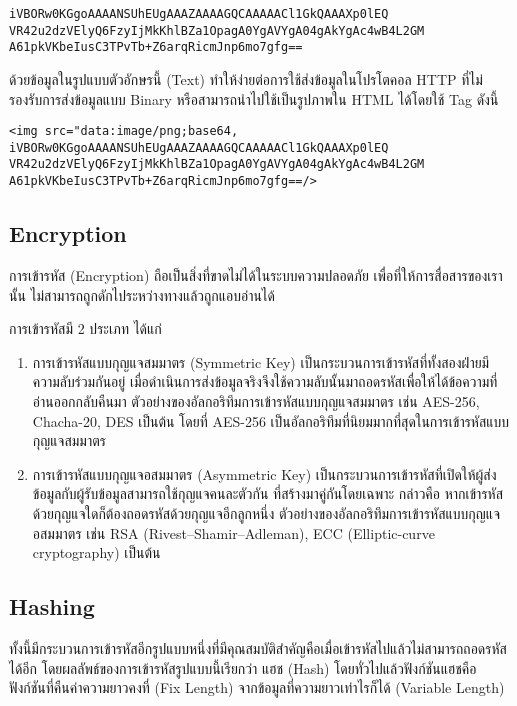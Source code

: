 \begin{lstlisting}[numbers=none]
iVBORw0KGgoAAAANSUhEUgAAAZAAAAGQCAAAAACl1GkQAAAXp0lEQ
VR42u2dzVElyQ6FzyIjMkKhlBZa1OpagA0YgAVYgA04gAkYgAc4wB4L2GM
A61pkVKbeIusC3TPvTb+Z6arqRicmJnp6mo7gfg==
\end{lstlisting}

ด้วยข้อมูลในรูปแบบตัวอักษรนี้ (Text) ทำให้ง่ายต่อการใช้ส่งข้อมูลในโปรโตคอล HTTP ที่ไม่รองรับการส่งข้อมูลแบบ Binary หรือสามารถนำไปใช้เป็นรูปภาพใน HTML ได้โดยใช้ Tag ดังนี้

\begin{lstlisting}[numbers=none]
<img src="data:image/png;base64, iVBORw0KGgoAAAANSUhEUgAAAZAAAAGQCAAAAACl1GkQAAAXp0lEQ VR42u2dzVElyQ6FzyIjMkKhlBZa1OpagA0YgAVYgA04gAkYgAc4wB4L2GM A61pkVKbeIusC3TPvTb+Z6arqRicmJnp6mo7gfg==/>
\end{lstlisting}

\subsection{Encryption}

การเข้ารหัส (Encryption) ถือเป็นสิ่งที่ขาดไม่ได้ในระบบความปลอดภัย เพื่อที่ให้การสื่อสารของเรานั้น ไม่สามารถถูกดักไประหว่างทางแล้วถูกแอบอ่านได้

การเข้ารหัสมี 2 ประเภท ได้แก่

\begin{enumerate}
	\itemsep0em 
	\item การเข้ารหัสแบบกุญแจสมมาตร (Symmetric Key) เป็นกระบวนการเข้ารหัสที่ทั้งสองฝ่ายมีความลับร่วมกันอยู่ เมื่อดำเนินการส่งข้อมูลจริงจึงใช้ความลับนั้นมาถอดรหัสเพื่อให้ได้ข้อความที่อ่านออกกลับคืนมา ตัวอย่างของอัลกอริทึมการเข้ารหัสแบบกุญแจสมมาตร เช่น AES-256, Chacha-20, DES เป็นต้น โดยที่ AES-256 เป็นอัลกอริทึมที่นิยมมากที่สุดในการเข้ารหัสแบบกุญแจสมมาตร
	\item การเข้ารหัสแบบกุญแจอสมมาตร (Asymmetric Key) เป็นกระบวนการเข้ารหัสที่เปิดให้ผู้ส่งข้อมูลกับผู้รับข้อมูลสามารถใช้กุญแจคนละตัวกัน ที่สร้างมาคู่กันโดยเฉพาะ กล่าวคือ หากเข้ารหัสด้วยกุญแจใดก็ต้องถอดรหัสด้วยกุญแจอีกลูกหนึ่ง ตัวอย่างของอัลกอริทึมการเข้ารหัสแบบกุญแจอสมมาตร เช่น RSA (Rivest–Shamir–Adleman), ECC (Elliptic-curve cryptography) เป็นต้น
\end{enumerate}

\subsection{Hashing}

ทั้งนี้มีกระบวนการเข้ารหัสอีกรูปแบบหนึ่งที่มีคุณสมบัติสำคัญคือเมื่อเข้ารหัสไปแล้วไม่สามารถถอดรหัสได้อีก โดยผลลัพธ์ของการเข้ารหัสรูปแบบนี้เรียกว่า แฮช (Hash) โดยทั่วไปแล้วฟังก์ชันแฮชคือฟังก์ชันที่คืนค่าความยาวคงที่ (Fix Length) จากข้อมูลที่ความยาวเท่าไรก็ได้ (Variable Length)

